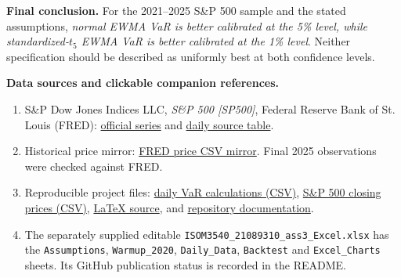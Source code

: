 \documentclass[10pt,a4paper]{article}
\begin{document}
\textbf{Final conclusion.}
For the 2021--2025 S\&P 500 sample and the stated assumptions, \emph{normal EWMA VaR is better calibrated at the 5\% level, while standardized-$t_5$ EWMA VaR is better calibrated at the 1\% level}. Neither specification should be described as uniformly best at both confidence levels.

\vspace{7pt}\textbf{Data sources and clickable companion references.}
\begin{enumerate}[leftmargin=1.8em,itemsep=2pt,topsep=2pt]
\item S\&P Dow Jones Indices LLC, \emph{S\&P 500 [SP500]}, Federal Reserve Bank of St. Louis (FRED): \href{https://fred.stlouisfed.org/series/SP500}{\textcolor{blue!55!black}{official series}} and \href{https://fred.stlouisfed.org/data/SP500}{\textcolor{blue!55!black}{daily source table}}.
\item Historical price mirror: \href{https://github.com/AguilarMike/marketobservatory/blob/main/data/sp500.csv}{\textcolor{blue!55!black}{FRED price CSV mirror}}. Final 2025 observations were checked against FRED.
\item Reproducible project files: \href{https://github.com/YongWilliam-ai/ISOM3540_ass3_2026/blob/main/analysis.csv}{\textcolor{blue!55!black}{daily VaR calculations (CSV)}}, \href{https://github.com/YongWilliam-ai/ISOM3540_ass3_2026/blob/main/all_closes.csv}{\textcolor{blue!55!black}{S\&P 500 closing prices (CSV)}}, \href{https://github.com/YongWilliam-ai/ISOM3540_ass3_2026/blob/main/ISOM3540_21089310_ass3.tex}{\textcolor{blue!55!black}{LaTeX source}}, and \href{https://github.com/YongWilliam-ai/ISOM3540_ass3_2026/blob/main/README.md}{\textcolor{blue!55!black}{repository documentation}}.
\item The separately supplied editable \texttt{ISOM3540\_21089310\_ass3\_Excel.xlsx} has the \texttt{Assumptions}, \texttt{Warmup\_2020}, \texttt{Daily\_Data}, \texttt{Backtest} and \texttt{Excel\_Charts} sheets. Its GitHub publication status is recorded in the README.
\end{enumerate}
\end{document}

